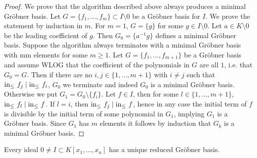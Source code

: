\begin{proof}
    We prove that the algorithm described above always produces a minimal Gröbner basis. Let $G=\{f_1,\dots,f_m\}\subset I\setminus0$ be a Gröbner basis for $I$. We prove the statement by induction in $m$. For $m=1$, $G=\{g\}$ for some $g\in I\setminus 0$. Let $a\in K\setminus 0$ be the leading coefficient of $g$. Then $G_0 = \{a^{-1}g\}$ defines a minimal Gröbner basis. Suppose the algorithm always terminates with a minimal Gröbner basis with mm elements for some $m\geq 1$. Let $G = \{f_1,\dots,f_{m+1}\}$ be a Gröbner basis and assume WLOG that the coefficient of the polynomials in $G$ are all $1$, i.e. that $G_0 = G$. Then if there are no $i,j\in\{1,\dots,m+1\}$ with $i\neq j$ such that $\mathrm{in}_\leq\ f_j\mid \mathrm{in}_\leq\ f_i$, $G_0$ we terminate and indeed $G_0$ is a minimal Gröbner basis. Otherwise we put $G_1 = G_0\setminus \{f_i\}$. Let $f\in I$, then for some $l\in\{1,\dots,m+1\}$, $\mathrm{in}_\leq\ f_l\mid\mathrm{in}_\leq \ f$. If $l = i$, then $\mathrm{in}_\leq\ f_j\mid \mathrm{in}_\leq\ f$, hence in any case the initial term of $f$ is divisible by the initial term of some polynomial in $G_1$, implying $G_1$ is a Gröbner basis. Since $G_1$ has $m$ elements it follows by induction that $G_k$ is a minimal Gröbner basis.  
\end{proof}
\begin{proposition}
    Every ideal $0\neq I\subset K[x_1,\dots,x_n]$ has a unique reduced Gröbner basis. 
\end{proposition}
